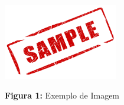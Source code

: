 \documentclass[a4paper,12pt]{article}
\begin{document}
\begin{center}

\includegraphics[width=5cm]{img/sample.png}

\textbf{Figura 1:} Exemplo de Imagem

\end{center}
\end{document}
